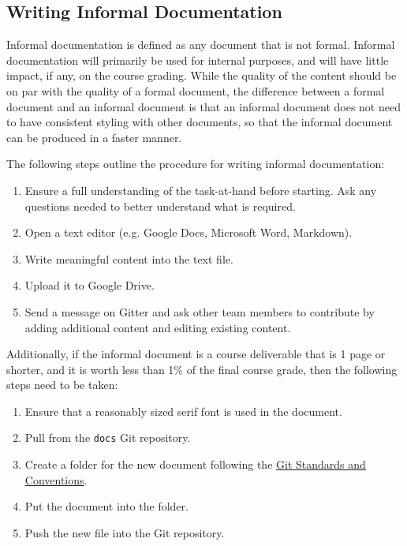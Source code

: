 \documentclass{article}
\begin{document}
\subsection{Writing Informal Documentation}
\label{sec:informal-documentation}
Informal documentation is defined as any document that is not formal. Informal documentation will primarily be used for internal purposes, and will have little impact, if any, on the course grading. While the quality of the content should be on par with the quality of a formal document, the difference between a formal document and an informal document is that an informal document does not need to have consistent styling with other documents, so that the informal document can be produced in a faster manner.

The following steps outline the procedure for writing informal documentation:

\begin{enumerate}
\item Ensure a full understanding of the task-at-hand before starting. Ask any questions needed to better understand what is required.
\item Open a text editor (e.g. Google Docs, Microsoft Word, Markdown).
\item Write meaningful content into the text file.
\item Upload it to Google Drive.
\item Send a message on Gitter and ask other team members to contribute by adding additional content and editing existing content.
\end{enumerate}

Additionally, if the informal document is a course deliverable that is 1 page or shorter, and it is worth less than 1\% of the final course grade, then the following steps need to be taken:

\begin{enumerate}
\item Ensure that a reasonably sized serif font is used in the document.
\item Pull from the \texttt{docs} Git repository.
\item Create a folder for the new document following the \hyperref[sec:git-conventions]{Git Standards and Conventions}.
\item Put the document into the folder.
\item Push the new file into the Git repository.
\end{enumerate}
\end{document}
